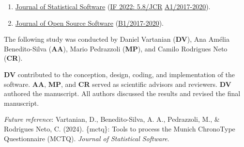 \documentclass[
  12pt,
  a4paper,
  oneside]{tesesusp}
\providecommand{\tightlist}{%
  \setlength{\itemsep}{0pt}\setlength{\parskip}{0pt}}\usepackage{longtable,booktabs,array}
\begin{document}
\begin{tcolorbox}[enhanced jigsaw, rightrule=.15mm, colback=white, colbacktitle=quarto-callout-note-color!10!white, toptitle=1mm, bottomtitle=1mm, toprule=.15mm, bottomrule=.15mm, colframe=quarto-callout-note-color-frame, opacitybacktitle=0.6, opacityback=0, coltitle=black, left=2mm, breakable, titlerule=0mm, title=\textcolor{quarto-callout-note-color}{\faInfo}\hspace{0.5em}{Target}, arc=.35mm, leftrule=.75mm]

\begin{enumerate}
\def\labelenumi{\arabic{enumi}.}
\tightlist
\item
  \href{https://www.jstatsoft.org/authors}{Journal of Statistical
  Software} (\href{https://jcr.clarivate.com/jcr/}{IF 2022: 5.8/JCR}
  \textbar{}
  \href{https://sucupira.capes.gov.br/sucupira/public/consultas/coleta/veiculoPublicacaoQualis/listaConsultaGeralPeriodicos.jsf}{A1/2017-2020}).
\item
  \href{https://joss.readthedocs.io/en/latest/submitting.html}{Journal
  of Open Source Software}
  (\href{https://sucupira.capes.gov.br/sucupira/public/consultas/coleta/veiculoPublicacaoQualis/listaConsultaGeralPeriodicos.jsf}{B1/2017-2020}).
\end{enumerate}

\end{tcolorbox}

\begin{tcolorbox}[enhanced jigsaw, rightrule=.15mm, colback=white, colbacktitle=quarto-callout-note-color!10!white, toptitle=1mm, bottomtitle=1mm, toprule=.15mm, bottomrule=.15mm, colframe=quarto-callout-note-color-frame, opacitybacktitle=0.6, opacityback=0, coltitle=black, left=2mm, breakable, titlerule=0mm, title=\textcolor{quarto-callout-note-color}{\faInfo}\hspace{0.5em}{Note}, arc=.35mm, leftrule=.75mm]

The following study was conducted by Daniel Vartanian (\textbf{DV}), Ana
Amélia Benedito-Silva (\textbf{AA}), Mario Pedrazzoli (\textbf{MP}), and
Camilo Rodrigues Neto (\textbf{CR}).

\vspace{5pt}

\textbf{DV} contributed to the conception, design, coding, and
implementation of the software. \textbf{AA}, \textbf{MP}, and
\textbf{CR} served as scientific advisors and reviewers. \textbf{DV}
authored the manuscript. All authors discussed the results and revised
the final manuscript.

\vspace{5pt}

\emph{Future reference}: Vartanian, D., Benedito-Silva, A. A.,
Pedrazzoli, M., \& Rodrigues Neto, C. (2024). \{mctq\}: Tools to process
the Munich ChronoType Questionnaire (MCTQ). \emph{Journal of Statistical
Software}.

\end{tcolorbox}
\end{document}

